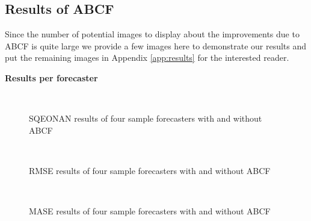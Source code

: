 \subsection{Results of ABCF}
Since the number of potential images to display about the improvements due to ABCF is quite large  we provide a few images here to demonstrate our results and put the remaining images in Appendix \ref{app:results} for the interested reader.

\bigskip
\noindent \textbf{Results per forecaster} 

\begin{figure}[!b]
	\begin{center}
		 \\
	\end{center}
	\caption{SQEONAN results of four sample forecasters with and without ABCF}
	\label{fig:sqe_results}
\end{figure}


\begin{figure}[!t]
	\begin{center}
		 \\
	\end{center}
	\caption{RMSE results of four sample forecasters with and without ABCF}
	\label{fig:rmse_results}
\end{figure}

\begin{figure}[!t]
	\begin{center}
		 \\
	\end{center}
	\caption{MASE results of four sample forecasters with and without ABCF}
	\label{fig:mase_results}
\end{figure}

